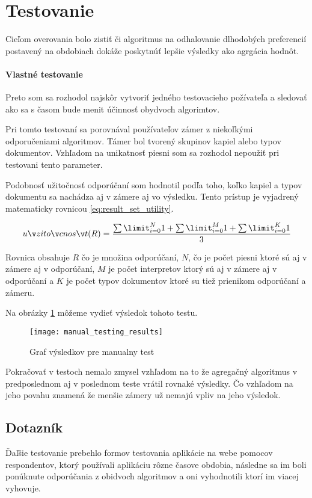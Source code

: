 \newpage

\section{Testovanie}

Cieľom overovania bolo zistiť či algoritmus na odhalovanie dlhodobých 
preferencií postavený na obdobiach dokáže poskytnúť lepšie výsledky ako 
agrgácia hodnôt.

\paragraph{Vlastné testovanie}

Preto som sa rozhodol najskôr vytvoriť jedného testovacieho požívateľa a sledovať 
ako sa s časom bude menit účinnosť obydvoch algorimtov. 

Pri tomto testovaní sa porovnával používateľov zámer z niekoľkými odporučeniami algoritmov.
Támer bol tvorený skupinov kapiel alebo typov dokumentov. Vzhľadom na unikatnosť piesni
som sa rozhodol nepoužiť pri testovani tento parameter.

Podobnosť užitočnosť odporúčaní som hodnotil podľa toho, koľko kapiel a typov dokumentu
sa nachádza aj v zámere aj vo výsledku. Tento prístup je vyjadrený matematicky 
rovnicou \ref{eq:result_set_utility}.

\begin{equation}\label{eq:result_set_utility}
užitočnosť(R) = \frac{\sum\limit_{i=0}^{N}1 + \sum\limit_{i=0}^{M} 1 +\sum\limit_{i=0}^{K}1}{3}
\end{equation}

Rovnica obsahuje \(R\) čo je množina odporúčaní, \(N\), čo je počet piesni ktoré sú aj v
zámere aj v odporúčaní, \(M\) je počet interpretov ktorý sú aj v zámere aj v odporúčaní a 
\(K\) je počet typov dokumentov ktoré su tiež prienikom odporúčaní a zámeru.

Na obrázky \ref{fig:manual_testing_results} môžeme vydieť výsledok tohoto testu.

\begin{figure}
    \begin{center}
        \texttt{[image: manual\_testing\_results]}
        \caption{Graf výsledkov pre manualny test}
        \label{fig:manual_testing_results}
    \end{center}
\end{figure}

Pokračovať v testoch nemalo zmysel vzhľadom na to že agregačný algoritmus v predposlednom
aj v poslednom teste vrátil rovnaké výsledky. Čo vzhľadom na jeho povahu znamená že 
menšie zámery už nemajú vpliv na jeho výsledok.

\subsection{Dotazník}

Ďaľšie testovanie prebehlo formov testovania aplikácie na webe pomocov respondentov, ktorý 
používali aplikáciu rôzne časove obdobia, následne sa im boli ponúknute odporúčania z obidvoch 
algoritmov a oni vyhodnotili ktorí im viacej vyhovuje.



